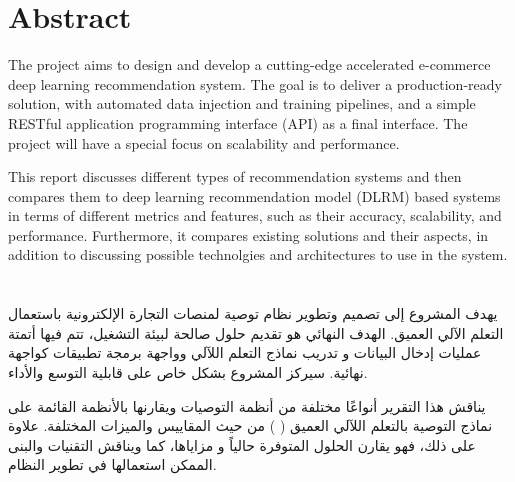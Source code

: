 \cleardoublepage {} {} \mtcaddchapter
\chapter*{Abstract}
The project aims to design and develop a cutting-edge accelerated e-commerce deep learning recommendation system. The goal is to deliver a production-ready solution, with automated data injection and training pipelines, and a simple RESTful application programming interface (API) as a final interface. The project will have a special focus on scalability and performance.

This report discusses different types of recommendation systems and then compares them to deep learning recommendation model (DLRM) based systems in terms of different metrics and features, such as their accuracy, scalability, and performance.
Furthermore, it compares existing solutions and their aspects, in addition to discussing possible technolgies and architectures to use in the system.
\cleardoublepage {} {} \mtcaddchapter
\chapter*{}
\begin{RLtext}
يهدف المشروع إلى تصميم وتطوير نظام توصية لمنصات التجارة الإلكترونية باستعمال التعلم الآلي العميق. الهدف النهائي هو تقديم حلول صالحة لبيئة التشغيل، تتم فيها أتمتة عمليات إدخال البيانات و تدريب نماذج التعلم اللآلي وواجهة برمجة تطبيقات 
 كواجهة نهائية. سيركز المشروع بشكل خاص على قابلية التوسع والأداء.

يناقش هذا التقرير أنواعًا مختلفة من أنظمة التوصيات ويقارنها بالأنظمة القائمة على نماذج التوصية بالتعلم اللآلي العميق (
    ) من حيث المقاييس والميزات المختلفة. علاوة على ذلك، فهو يقارن الحلول المتوفرة حالياً و مزاياها، كما ويناقش التقنيات والبنى الممكن استعمالها في تطوير النظام.
\end{RLtext}

\justifying